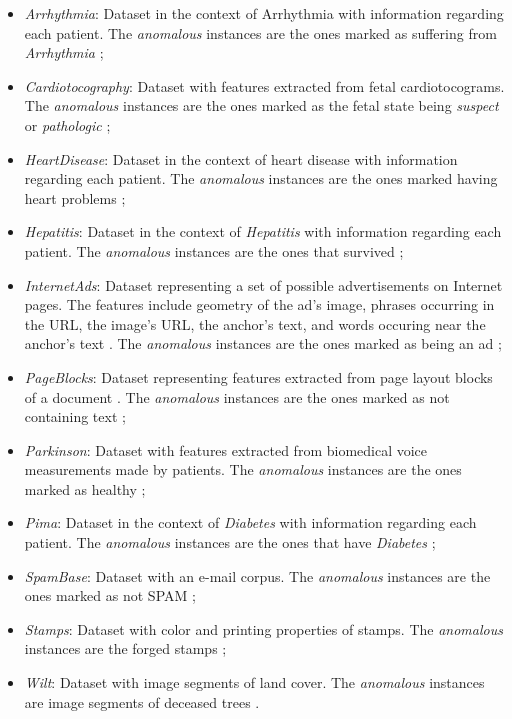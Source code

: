\begin{itemize}
	\item \textit{Arrhythmia}: Dataset in the context of Arrhythmia with information regarding each patient. The \textit{anomalous} instances are the ones marked as suffering from \textit{Arrhythmia} \cite{Campos2016};
	
	\item \textit{Cardiotocography}: Dataset with features extracted from fetal cardiotocograms. The \textit{anomalous} instances are the ones marked as the fetal state being \textit{suspect} or \textit{pathologic} \cite{Campos2016};
	
	\item \textit{HeartDisease}: Dataset in the context of heart disease with information regarding each patient. The \textit{anomalous} instances are the ones marked having heart problems \cite{Campos2016};
	
	\item \textit{Hepatitis}: Dataset in the context of \textit{Hepatitis} with information regarding each patient. The \textit{anomalous} instances are the ones that survived \cite{Campos2016};
	
	\item \textit{InternetAds}: Dataset representing a set of possible advertisements on Internet pages. The features include geometry of the ad's image, phrases occurring in the URL, the image's URL, the anchor's text, and words occuring near the anchor's text \cite{Alimoglu96methodsof}. The \textit{anomalous} instances are the ones marked as being an ad \cite{Campos2016};
	
	\item \textit{PageBlocks}: Dataset representing features extracted from page layout blocks of a document \cite{Malerba1996}. The \textit{anomalous} instances are the ones marked as not containing text \cite{Campos2016};
	
	\item \textit{Parkinson}: Dataset with features extracted from biomedical voice measurements made by patients. The \textit{anomalous} instances are the ones marked as healthy \cite{Campos2016};
	
	\item \textit{Pima}: Dataset in the context of \textit{Diabetes} with information regarding each patient. The \textit{anomalous} instances are the ones that have \textit{Diabetes} \cite{Campos2016};
	
	\item \textit{SpamBase}: Dataset with an e-mail corpus. The \textit{anomalous} instances are the ones marked as not SPAM \cite{Campos2016};
	
	\item \textit{Stamps}: Dataset with color and printing properties of stamps. The \textit{anomalous} instances are the forged stamps \cite{Campos2016};
	
	\item \textit{Wilt}: Dataset with image segments of land cover. The \textit{anomalous} instances are image segments of deceased trees \cite{Campos2016}. 
\end{itemize}

